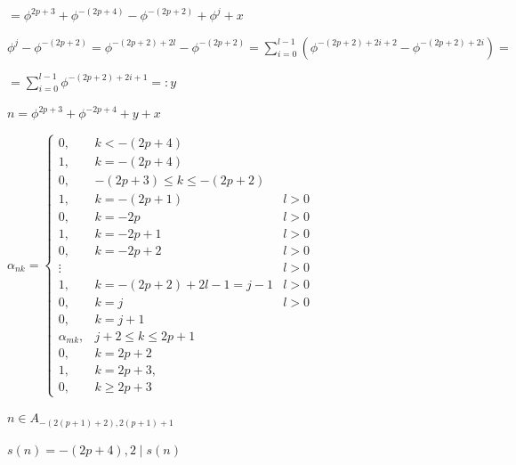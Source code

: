 \documentclass{article}
\begin{document}
$= \phi^{2p+3} + \phi^{-(2p+4)} - \phi^{-(2p+2)} + \phi^j + x$

$\phi^j - \phi^{-(2p+2)} = \phi^{-(2p+2) + 2l} - \phi^{-(2p+2)} = \sum_{i=0}^{l-1}(\phi^{-(2p+2) + 2i+2} - \phi^{-(2p+2) + 2i}) =$

$= \sum_{i=0}^{l-1} \phi^{-(2p+2) + 2i+1} =: y$

$n = \phi^{2p+3} + \phi^{-2p+4} + y + x$

$\alpha_{nk} = \left\{\begin{array}{lll} 0, & k < -(2p+4)\\1, & k = -(2p+4)\\0, & -(2p+3) \leq k \leq -(2p+2)\\ 1, & k = -(2p+1) & l > 0 \\ 0, & k = -2p & l > 0 \\ 1, & k = -2p+1 & l >0 \\ 0, & k = -2p+2 & l >0\\ \vdots && l > 0 \\ 1, & k = -(2p+2) + 2l - 1 = j - 1 & l > 0 \\ 0, & k = j & l > 0 \\ 0, & k = j + 1\\ \alpha_{mk}, & j + 2 \leq k \leq 2p + 1 \\ 0, & k = 2p + 2\\ 1, & k = 2p+3, \\ 0, & k \geq 2p + 3 \end{array}\right.$

$n \in A_{-(2(p+1)+2),2(p+1)+1}$

$s(n) = -(2p+4), 2 \mid s(n)$
\end{document}
